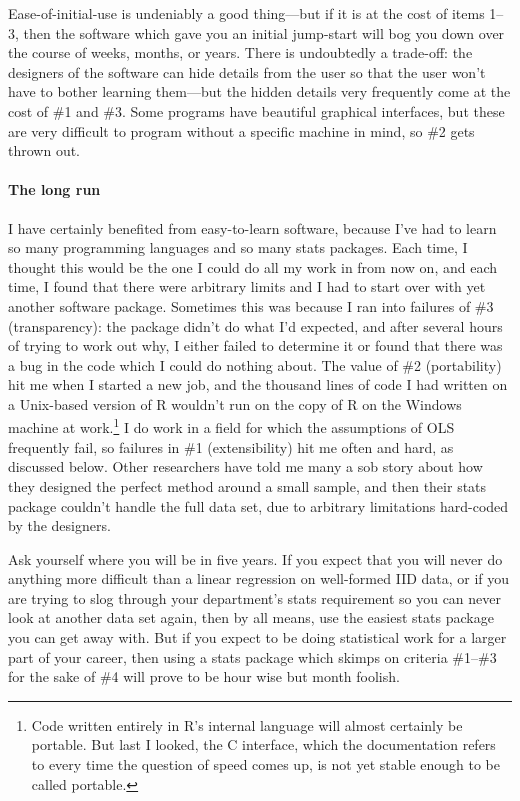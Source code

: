 Ease-of-initial-use is undeniably a good thing---but if it is at the cost
of items 1--3, then the software which gave you an initial jump-start will
bog you down over the course of weeks, months, or years. There is
undoubtedly a trade-off: the designers of the software can hide details
from the user so that the user won't have to bother learning them---but
the hidden details very frequently come at the cost of \#1 and \#3. Some
programs have beautiful graphical interfaces, but these are very difficult
to program without a specific machine in mind, so \#2 gets thrown out.

\paragraph{The long run}
I have certainly benefited from easy-to-learn software, because I've had to learn
so many programming languages and so many stats packages. Each time, I thought
this would be the one I could do all my work in from now on, and each time, I
found that there were arbitrary limits and I had to start over with yet another software package.
Sometimes this was because I ran into failures of \#3 (transparency): the package
didn't do what I'd expected, and after several hours of trying to work
out why, I either failed to determine it or found that there was a bug
in the code which I could do nothing about. The value of \#2 (portability) hit me
when I started a new job, and the thousand lines of code I had written on a Unix-based version of R wouldn't run
on the copy of R on the Windows machine at work.\footnote{Code written entirely in R's internal language will
almost certainly be portable. But last I looked, the C interface,
which the documentation refers to every time the question of speed comes
up, is not yet stable enough to be called portable.} I do work in a field for which the
assumptions of OLS frequently fail, so failures in \#1 (extensibility) hit me often and hard,
as discussed below. Other researchers have told me many a sob story
about how they designed the perfect method around a small sample, and
then their stats package couldn't handle the full data set, due to
arbitrary limitations hard-coded by the designers.

Ask yourself where you will be in five years. If you expect that you will never do
anything more difficult than a linear regression on well-formed IID data,
or if you are trying to slog through your department's stats requirement
so you can never look at another data set again, then by all means,
use the easiest stats package you can get away with. But if you expect to
be doing statistical work for a larger part of your career, then using a
stats package which skimps on criteria \#1--\#3 for the sake of \#4 will
prove to be hour wise but month foolish.

